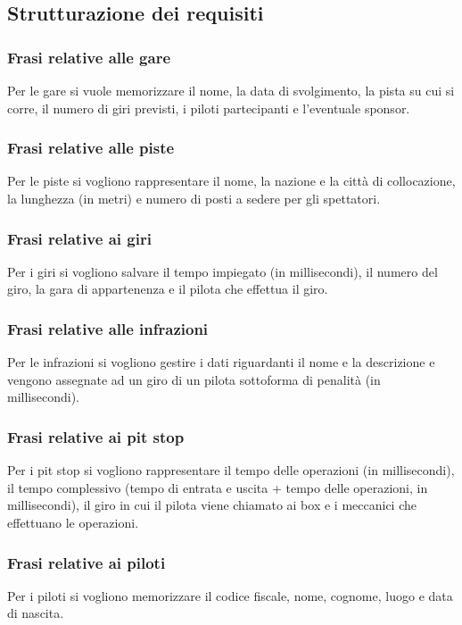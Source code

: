 \documentclass[11pt]{article}
\begin{document}
\subsection{Strutturazione dei requisiti}

\subsubsection*{Frasi relative alle gare}
Per le gare si vuole memorizzare il nome, la data di svolgimento, la pista su cui si corre, il numero di giri previsti, i piloti partecipanti e l'eventuale sponsor.

\subsubsection*{Frasi relative alle piste}
Per le piste si vogliono rappresentare il nome, la nazione e la città di collocazione, la lunghezza (in metri) e numero di posti a sedere per gli spettatori.

\subsubsection*{Frasi relative ai giri}
Per i giri si vogliono salvare il tempo impiegato (in millisecondi), il numero del giro, la gara di appartenenza e il pilota che effettua il giro.

\subsubsection*{Frasi relative alle infrazioni}
Per le infrazioni si vogliono gestire i dati riguardanti il nome e la descrizione e vengono assegnate ad un giro di un pilota sottoforma di penalità (in millisecondi).

\subsubsection*{Frasi relative ai pit stop}
Per i pit stop si vogliono rappresentare il tempo delle operazioni (in millisecondi), il tempo complessivo (tempo di entrata e uscita + tempo delle operazioni, in millisecondi), 
il giro in cui il pilota viene chiamato ai box e i meccanici che effettuano le operazioni.

\subsubsection*{Frasi relative ai piloti}
Per i piloti si vogliono memorizzare il codice fiscale, nome, cognome, luogo e data di nascita.
\end{document}
